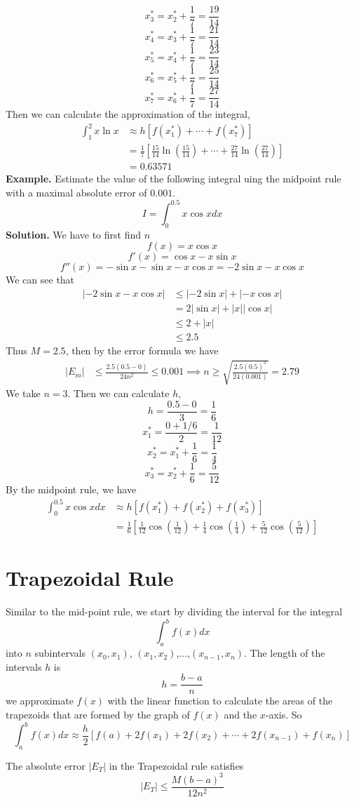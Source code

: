 \documentclass[openany]{report}
\begin{document}
\[x_3^* = x_2^* + \frac{1}{7} = \frac{19}{14}\]
\[x_4^* = x_3^* + \frac{1}{7} = \frac{21}{14}\]
\[x_5^* = x_4^* + \frac{1}{7} = \frac{23}{14}\]
\[x_6^* = x_5^* + \frac{1}{7} = \frac{25}{14}\]
\[x_7^* = x_6^* + \frac{1}{7} = \frac{27}{14}\]
Then we can calculate the approximation of the integral,
\begin{align*}
    \int_1^2 x\ln x &\approx h[f(x_1^*) + \cdots + f(x_7^*)]\\
    &= \frac{1}{7}\left[\frac{15}{14} \ln \left(\frac{15}{14}\right) + \cdots + \frac{27}{14}\ln\left(\frac{27}{14}\right)\right]\\
    &= 0.63571
\end{align*}
\textbf{Example.} Estimate the value of the following integral uing the midpoint rule with a maximal absolute error of $0.001$.
\[I = \int_0^{0.5}x\cos x dx\]
\textbf{Solution.} We have to first find $n$ 
\[f(x) = x\cos x\]
\[f'(x) = \cos x - x\sin x\]
\[f''(x) = -\sin x - \sin x - x\cos x = -2\sin x - x\cos x\]
We can see that 
\begin{align*}
    |-2\sin x - x\cos x| &\leq |-2\sin x| + |-x\cos x|\\
    &= 2|\sin x| + |x||\cos x|\\
    &\leq 2 + |x|\\
    &\leq 2.5   
\end{align*}
Thus $M = 2.5$, then by the error formula we have
\begin{align*}
    |E_m| &\leq \frac{2.5(0.5-0)}{24n^2} \leq 0.001  \implies n \geq \sqrt{\frac{2.5(0.5)^3}{24(0.001)}} = 2.79
\end{align*}
We take $n = 3$. Then we can calculate $h$,
\[h = \frac{0.5 -0}{3} = \frac{1}{6}\]
\[x_1^* = \frac{0 + 1/6}{2} = \frac{1}{12}\]
\[x_2^* = x_1^* + \frac{1}{6} = \frac{1}{4}\]
\[x_3^* = x_2^* + \frac{1}{6} = \frac{5}{12}\]
By the midpoint rule, we have 
\begin{align*}
    \int_{0}^{0.5} x\cos x dx &\approx h[f(x_1^*) + f(x_2^*) + f(x_3^*)]\\
    &= \frac{1}{6}\left[\frac{1}{12}\cos \left(\frac{1}{12}\right) + \frac{1}{4}\cos \left(\frac{1}{4}\right) + \frac{5}{12}\cos \left(\frac{5}{12}\right)\right]
\end{align*}

\section{Trapezoidal Rule}
Similar to the mid-point rule, we start by dividing the interval for the integral 
\[\int_a^b f(x)dx\]
into $n$ subintervals $(x_0,x_1)$, $(x_1,x_2)$,$\ldots$,$(x_{n-1}, x_n)$. The length of the intervals $h$ is 
\[h = \frac{b-a}{n}\]
we approximate $f(x)$ with the linear function to calculate the areas of the trapezoids that are formed by the graph of $f(x)$ and the $x$-axis. So 
\[\int_a^b f(x)dx\approx \frac{h}{2}\left[f(a) + 2f(x_1) + 2f(x_2) + \cdots + 2f(x_{n-1}) + f(x_n)\right]\]
\begin{theorem}
    The absolute error $|E_T|$ in the Trapezoidal rule satisfies
    \[|E_T| \leq \frac{M(b-a)^3}{12n^2}\]
\end{theorem}
\end{document}
